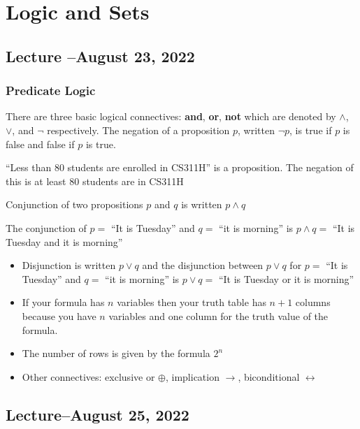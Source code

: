 \chapter{Logic and Sets}

\section{Lecture --August 23, 2022}
\subsection{Predicate Logic}

There are three basic logical connectives: \textbf{and}, \textbf{or}, \textbf{not}
which are denoted by $\land$, $\lor$, and $\neg$ respectively.
The negation of a proposition $p$, written $\neg p$, is true if $p$ is false and false if $p$ is true.

\begin{example}
	``Less than 80 students are enrolled in CS311H'' is a proposition. The negation of this is at least $80$ students are in CS311H
\end{example}

Conjunction of two propositions $p$ and $q$ is written $p\land q$

\begin{example}
	The conjunction of $p=$ ``It is Tuesday'' and $q=$ ``it is morning'' is $p\land q=$ ``It is Tuesday and it is morning''
\end{example}

\begin{itemize}
	\item Disjunction is written $p\lor q$ and the disjunction between $p\lor q$ for $p=$ ``It is Tuesday'' and $q=$ ``it is morning'' is $p\lor q=$ ``It is Tuesday or it is morning''
	\item If your formula has $n$ variables then your truth table has $n+1$ columns because you have $n$ variables and one column for the truth value of the formula.
	\item The number of rows is given by the formula $2^n$
	\item Other connectives: exclusive or $\oplus$, implication $\rightarrow$, biconditional $\leftrightarrow$
\end{itemize}

\section{Lecture--August 25, 2022}

